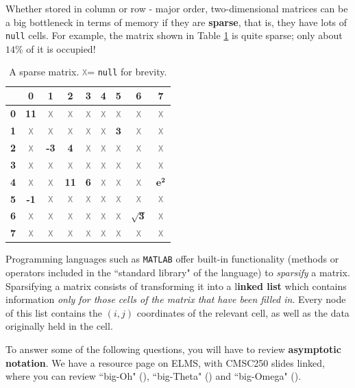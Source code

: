 \documentclass[letterpaper,12pt]{article}
\newcommand{\Xt}{\small \textcolor{gray}{\texttt{X}}}
\begin{document}
\pagebreak


Whether stored in column or row - major order, two-dimensional matrices can be a big bottleneck in terms of memory if they are \textbf{sparse}, that is, they have lots of {\tt null} cells. For example, the matrix shown in Table \ref{tbl:sparseMat} is quite sparse; only about $14\%$ of it is occupied!

\begin{table}[H]
    \centering
	\begin{tabular}{c | c c c c c c c c} 
		\  & \textbf{0} & \textbf{1} & \textbf{2} & \textbf{3} & \textbf{4} & \textbf{5} & \textbf{6} & \textbf{7} \\ \hline 
		\textbf{0} & \textbf{11} & \Xt & \Xt & \Xt & \Xt & \Xt & \Xt & \Xt \\
		\textbf{1} & \Xt & \Xt & \Xt & \Xt & \Xt & $\mathbf{3}$ & \Xt & \Xt \\
		\textbf{2} & \Xt & \textbf{-3} & \textbf{4} & \Xt & \Xt & \Xt & \Xt & \Xt \\
		\textbf{3} & \Xt & \Xt & \Xt & \Xt & \Xt & \Xt & \Xt & \Xt \\	
		\textbf{4} & \Xt & \Xt & \textbf{11} & \textbf{6} & \Xt & \Xt & \Xt & $\mathbf{e^2}$ \\
		\textbf{5} & \textbf{-1} & \Xt & \Xt & \Xt & \Xt & \Xt & \Xt & \Xt \\
		\textbf{6} & \Xt & \Xt & \Xt & \Xt & \Xt & \Xt & $\mathbf{\sqrt{3}}$ & \Xt \\
		\textbf{7} & \Xt & \Xt & \Xt & \Xt & \Xt & \Xt & \Xt & \Xt \\	
	\end{tabular}
	\caption{A sparse matrix.  \Xt = \texttt{null} for brevity.}
	\label{tbl:sparseMat}
\end{table}

Programming languages such as {\tt MATLAB} offer built-in functionality (methods or operators included in the ``standard library" of the language) to {\em sparsify} a matrix. Sparsifying a matrix consists of transforming it into a l\textbf{inked list} which contains information {\em only for those cells of the matrix that have been filled in}. Every node of this list contains the $(i, j)$ coordinates of the relevant cell, as well as the data originally held in the cell. 

To answer some of the following questions, you will have to review {\bf asymptotic notation}. We have a resource page on ELMS, with CMSC250 slides linked, where you can review ``big-Oh" (\bigoh{$\cdot$}), ``big-Theta" (\bigtheta{$\cdot$}) and ``big-Omega" (\bigomega{$\cdot$}). 
\end{document}
